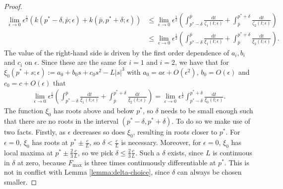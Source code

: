\documentclass[10pt,a4paper]{amsart}
\begin{document}
\begin{proof}
    \begin{align*}
        \lim_{\epsilon\to 0}\epsilon^{\frac{1}{2}}\left(k(p^*-\delta,\bar{p};\epsilon)+k(\bar{p},p^*+\delta;\epsilon)\right)&\le\lim_{\epsilon\to 0}\epsilon^{\frac{1}{2}}\left(\int_{p^*-\delta}^{\bar{p}}\frac{\mathrm{d}t}{\zeta_1(t;\epsilon)}+\int_{\bar{p}}^{p^*+\delta}\frac{\mathrm{d}t}{\zeta_2(t;\epsilon)}\right)\\
        &\le\lim_{\epsilon\to 0}\epsilon^{\frac{1}{2}}\left(\int_{p^*-\delta}^{\bar{p}}\frac{\mathrm{d}t}{\xi_1(t;\epsilon)}+\int^{p^*+\delta}_{\bar{p}}\frac{\mathrm{d}t}{\xi_2(t;\epsilon)}\right).
    \end{align*}
    The value of the right-hand side is driven by the first order dependence of $a_i,b_i$ and $c_i$ on $\epsilon$. Since these are the same for $i=1$ and $i=2$, we have that for $\xi_0(p^*+s;\epsilon):=a_0+b_0s+c_0s^2-L|s|^3$ with $a_0=a\epsilon+O(\epsilon^2)$, $b_0=O(\epsilon)$ and $c_0=c+O(\epsilon)$ that 
    \begin{align}
        \lim_{\epsilon\to 0}\epsilon^{\frac{1}{2}}\left(\int_{p^*-\delta}^{\bar{p}}\frac{\mathrm{d}t}{\xi_1(t;\epsilon)}+\int^{p^*+\delta}_{\bar{p}}\frac{\mathrm{d}t}{\xi_2(t;\epsilon)}\right)=\lim_{\epsilon\to 0}\epsilon^{\frac{1}{2}}\int_{p^*-\delta}^{p^*+\delta}\frac{\mathrm{d}t}{\xi_0(t;\epsilon)}.\label{eq:xi-0}
    \end{align}
    The function $\xi_0$ has roots above and below $p^*$, so $\delta$ needs to be small enough such that there are no roots in the interval $(p^*-\delta,p^*+\delta)$. To do so we make use of two facts. Firstly, as $\epsilon$ decreases so does $\xi_0$, resulting in roots closer to $p^*$. For $\epsilon=0$, $\xi_0$ has roots at $p^*\pm\frac{c}{L}$, so $\delta <\frac{c}{L}$ is necessary. Moreover, for $\epsilon=0$, $\xi_0$ has local maxima at $p^*\pm\frac{2}{3}\frac{c}{L}$, so we pick $\delta\le\frac{2}{3}\frac{c}{L}$. 
    Such a $\delta$ exists, since $L$ is continuous in $\delta$ at zero, because $F_{\max}$ is three times continuously differentiable at $p^*$. This is not in conflict with Lemma \ref{lemma:delta-choice}, since $\delta$ can always be chosen smaller.
    

\end{proof}
\end{document}

